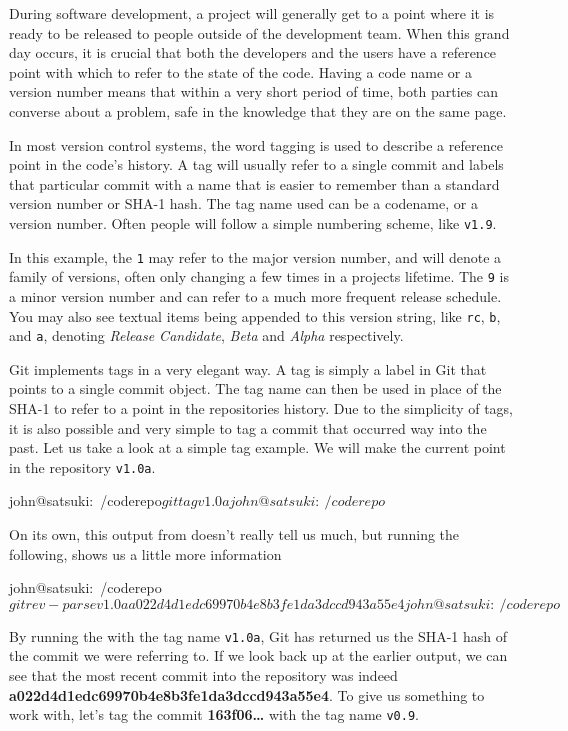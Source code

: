 During software development, a project will generally get to a point where it is ready to be released to people outside of the development team.
When this grand day occurs, it is crucial that both the developers and the users have a reference point with which to refer to the state of the code.
Having a code name or a version number means that within a very short period of time, both parties can converse about a problem, safe in the knowledge that they are on the same page.

In most version control systems, the word tagging is used to describe a reference point in the code's history.
A tag will usually refer to a single commit and labels that particular commit with a name that is easier to remember than a standard version number or SHA-1 hash.
The tag name used can be a codename, or a version number.
Often people will follow a simple numbering scheme, like \texttt{v1.9}.

In this example, the \texttt{1} may refer to the major version number, and will denote a family of versions, often only changing a few times in a projects lifetime.
The \texttt{9} is a minor version number and can refer to a much more frequent release schedule.
You may also see textual items being appended to this version string, like \texttt{rc}, \texttt{b}, and \texttt{a}, denoting \emph{Release Candidate}, \emph{Beta} and \emph{Alpha} respectively.

Git implements tags in a very elegant way.
A tag is simply a label in Git that points to a single commit object.
The tag name can then be used in place of the SHA-1 to refer to a point in the repositories history.
Due to the simplicity of tags, it is also possible and very simple to tag a commit that occurred way into the past.
Let us take a look at a simple tag example.
We will make the current point in the repository \texttt{v1.0a}.

\begin{code}
john@satsuki:~/coderepo$ git tag v1.0a
john@satsuki:~/coderepo$
\end{code}

On its own, this output from  doesn't really tell us much, but running the following, shows us a little more information

\begin{code}
john@satsuki:~/coderepo$ git rev-parse v1.0a
a022d4d1edc69970b4e8b3fe1da3dccd943a55e4
john@satsuki:~/coderepo$
\end{code}

By running the  with the tag name \texttt{v1.0a}, Git has returned us the SHA-1 hash of the commit we were referring to.
If we look back up at the earlier output, we can see that the most recent commit into the repository was indeed \textbf{a022d4d1edc69970b4e8b3fe1da3dccd943a55e4}.
To give us something to work with, let's tag the commit \textbf{163f06\ldots} with the tag name \texttt{v0.9}.

